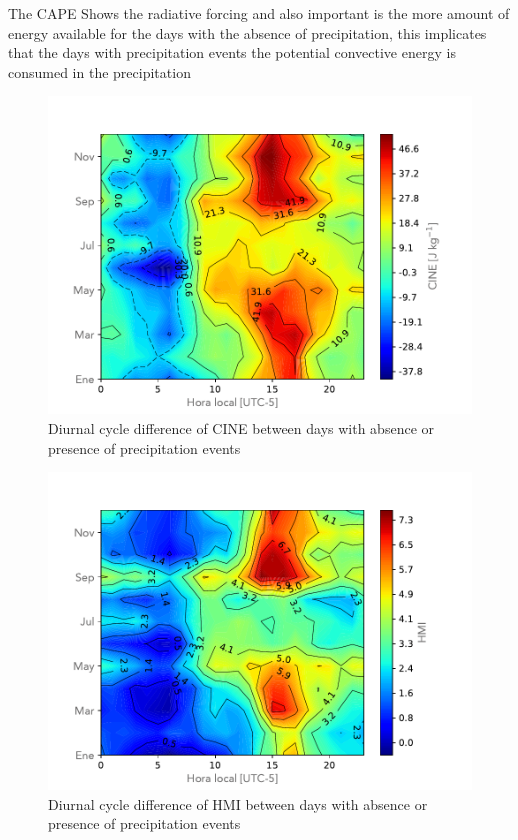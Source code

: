 \documentclass{ametsoc}
\begin{document}
The CAPE Shows the radiative forcing and also important is the more amount of energy available for the days with the absence of precipitation, this implicates that the days with precipitation events the potential convective energy is consumed in the precipitation


\begin{figure}[h!]
\centering
\includegraphics[width=1.0\linewidth]{Figuras/CINE_Matrix_resta.pdf}
\caption{Diurnal cycle difference of CINE between days with absence or presence of precipitation events }
\label{fig:CINEdifference}
\end{figure}


\begin{figure}[h!]
\centering
\includegraphics[width=1.0\linewidth]{Figuras/HMI_Matrix_resta.pdf}
\caption{Diurnal cycle difference of HMI between days with absence or presence of precipitation events }
\label{fig:HMIdifference}
\end{figure}
\end{document}
